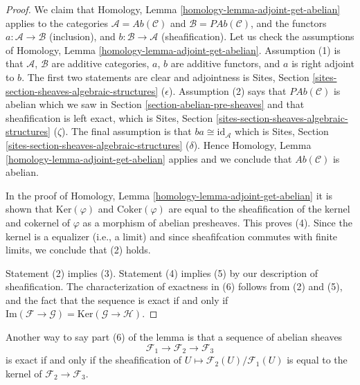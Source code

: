 \begin{proof}
We claim that Homology, Lemma \ref{homology-lemma-adjoint-get-abelian}
applies to the categories $\mathcal{A} = \textit{Ab}(\mathcal{C})$
and $\mathcal{B} = \textit{PAb}(\mathcal{C})$, and the functors
$a : \mathcal{A} \to \mathcal{B}$ (inclusion),  and
$b : \mathcal{B} \to \mathcal{A}$ (sheafification).
Let us check the assumptions of
Homology, Lemma \ref{homology-lemma-adjoint-get-abelian}.
Assumption (1) is that $\mathcal{A}$, $\mathcal{B}$ are additive categories,
$a$, $b$ are additive functors, and $a$ is right adjoint to $b$.
The first two statements are clear and adjointness is
Sites, Section \ref{sites-section-sheaves-algebraic-structures} ($\epsilon$).
Assumption (2) says that $\textit{PAb}(\mathcal{C})$ is abelian
which we saw in Section \ref{section-abelian-pre-sheaves} and
that sheafification is left exact, which is
Sites, Section \ref{sites-section-sheaves-algebraic-structures} ($\zeta$).
The final assumption is that $ba \cong \text{id}_\mathcal{A}$ which is
Sites, Section \ref{sites-section-sheaves-algebraic-structures} ($\delta$).
Hence Homology, Lemma \ref{homology-lemma-adjoint-get-abelian}
applies and we conclude that $\textit{Ab}(\mathcal{C})$ is abelian.

\medskip\noindent
In the proof of Homology, Lemma \ref{homology-lemma-adjoint-get-abelian}
it is shown that $\text{Ker}(\varphi)$ and $\text{Coker}(\varphi)$
are equal to the sheafification of the kernel and cokernel of $\varphi$
as a morphism of abelian presheaves. This proves (4). Since the kernel
is a equalizer (i.e., a limit) and since sheafifcation commutes with
finite limits, we conclude that (2) holds.

\medskip\noindent
Statement (2) implies (3). Statement (4) implies (5) by our description
of sheafification. The characterization of exactness in (6) follows from
(2) and (5), and the fact that the sequence is exact if and only if
$\text{Im}(\mathcal{F} \to \mathcal{G}) =
\text{Ker}(\mathcal{G} \to \mathcal{H})$.
\end{proof}

\noindent
Another way to say part (6) of the lemma is that a
sequence of abelian sheaves
$$
\mathcal{F}_1 \longrightarrow
\mathcal{F}_2 \longrightarrow
\mathcal{F}_3
$$
is exact if and only if the sheafification of
$U \mapsto \mathcal{F}_2(U)/\mathcal{F}_1(U)$ is equal to the
kernel of $\mathcal{F}_2 \to \mathcal{F}_3$.

